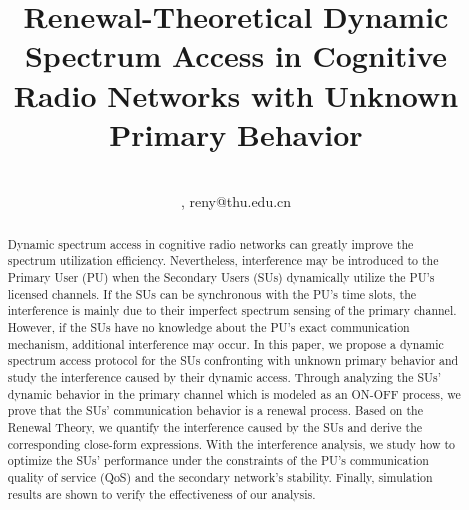 \documentclass[11pt,draftcls]{IEEEtran}{\onecolumn}
\begin{document}
\title{Renewal-Theoretical Dynamic Spectrum Access in Cognitive Radio Networks with Unknown Primary Behavior}


\author{ \\ \small{}, reny@thu.edu.cn}


















\maketitle

\begin{abstract}
Dynamic spectrum access in cognitive radio networks can greatly
improve the spectrum utilization efficiency. Nevertheless,
interference may be introduced to the Primary User (PU) when the
Secondary Users (SUs) dynamically utilize the PU's licensed
channels. If the SUs can be synchronous with the PU's time slots,
the interference is mainly due to their imperfect spectrum sensing
of the primary channel. However, if the SUs have no knowledge about
the PU's exact communication mechanism, additional interference may
occur. In this paper, we propose a dynamic spectrum access protocol
for the SUs confronting with unknown primary behavior and study the
interference caused by their dynamic access. Through analyzing the
SUs' dynamic behavior in the primary channel which is modeled as an
ON-OFF process, we prove that the SUs' communication behavior is a
renewal process. Based on the Renewal Theory, we quantify the
interference caused by the SUs and derive the corresponding
close-form expressions. With the interference analysis, we study how
to optimize the SUs' performance under the constraints of the PU's
communication quality of service (QoS) and the secondary network's
stability. Finally, simulation results are shown to verify the
effectiveness of our analysis.
\end{abstract}
\end{document}
